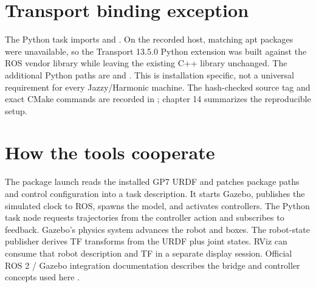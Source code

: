 \section{Transport binding exception}
The Python task imports  and . On the
recorded host, matching apt packages were unavailable, so the Transport 13.5.0
Python extension was built against the ROS vendor library while leaving the
existing C++ library unchanged. The additional Python paths are
 and
. This is installation
specific, not a universal requirement for every Jazzy/Harmonic machine. The
hash-checked source tag and exact CMake commands are recorded in
; chapter 14 summarizes the reproducible setup.

\section{How the tools cooperate}
The package launch reads the installed GP7 URDF and patches package paths and
control configuration into a task description. It starts Gazebo, publishes
the simulated clock to ROS, spawns the model, and activates controllers. The
Python task node requests trajectories from the controller action and
subscribes to feedback. Gazebo's physics system advances the robot and boxes.
The robot-state publisher derives TF transforms from the URDF plus joint
states. RViz can consume that robot description and TF in a separate display
session. Official ROS 2 / Gazebo integration documentation describes the
bridge and controller concepts used here \cite{ros2_jazzy,gazebo_harmonic,ros2_control_jtc}.
